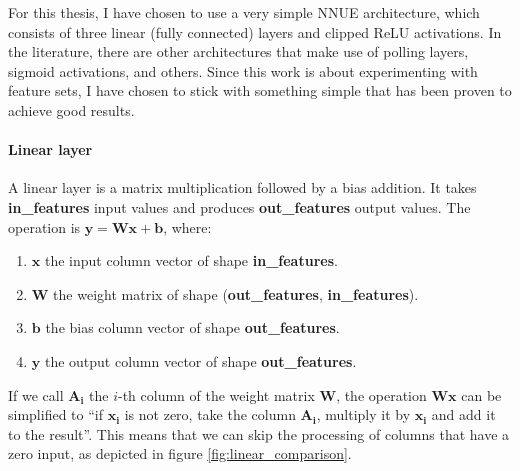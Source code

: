 For this thesis, I have chosen to use a very simple NNUE architecture, which consists of three linear (fully connected) layers and clipped ReLU activations. In the literature, there are other architectures that make use of polling layers, sigmoid activations, and others. Since this work is about experimenting with feature sets, I have chosen to stick with something simple that has been proven to achieve good results.
\clearpage

\paragraph[short]{Linear layer} A linear layer is a matrix multiplication followed by a bias addition. It takes \textbf{in\_features} input values and produces \textbf{out\_features} output values. The operation is $\bm{y} = \bm{W} \bm{x} + \bm{b}$, where:

\begin{enumerate}
\item $\bm{x}$ the input column vector of shape \textbf{in\_features}.
\item $\bm{W}$ the weight matrix of shape (\textbf{out\_features}, \textbf{in\_features}).
\item $\bm{b}$ the bias column vector of shape \textbf{out\_features}.
\item $\bm{y}$ the output column vector of shape \textbf{out\_features}.
\end{enumerate}

If we call $\bm{A_i}$ the $i$-th column of the weight matrix $\bm{W}$, the operation $\bm{W} \bm{x}$ can be simplified to \enquote{if $\bm{x_i}$ is not zero, take the column $\bm{A_i}$, multiply it by $\bm{x_i}$ and add it to the result}. This means that we can skip the processing of columns that have a zero input, as depicted in figure \ref{fig:linear_comparison}.

